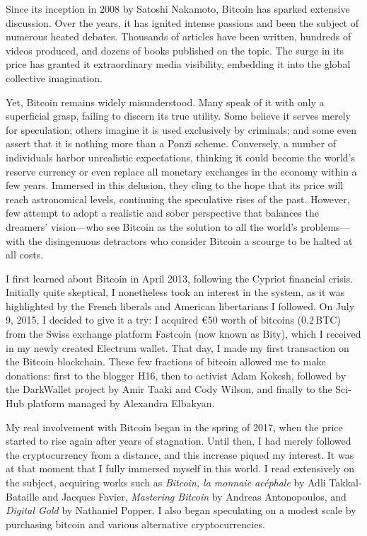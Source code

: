 \documentclass[
  a5paper,
  smalldemyvopaper,10pt,twoside,onecolumn,openright,extrafontsizes,hidelinks]{memoir}
\begin{document}

Since its inception in 2008 by Satoshi Nakamoto, Bitcoin has sparked
extensive discussion. Over the years, it has ignited intense passions
and been the subject of numerous heated debates. Thousands of articles
have been written, hundreds of videos produced, and dozens of books
published on the topic. The surge in its price has granted it
extraordinary media visibility, embedding it into the global collective
imagination.

Yet, Bitcoin remains widely misunderstood. Many speak of it with only a
superficial grasp, failing to discern its true utility. Some believe it
serves merely for speculation; others imagine it is used exclusively by
criminals; and some even assert that it is nothing more than a Ponzi
scheme. Conversely, a number of individuals harbor unrealistic
expectations, thinking it could become the world's reserve currency or
even replace all monetary exchanges in the economy within a few years.
Immersed in this delusion, they cling to the hope that its price will
reach astronomical levels, continuing the speculative rises of the past.
However, few attempt to adopt a realistic and sober perspective that
balances the dreamers' vision---who see Bitcoin as the solution to all
the world's problems---with the disingenuous detractors who consider
Bitcoin a scourge to be halted at all costs.

I first learned about Bitcoin in April 2013, following the Cypriot
financial crisis. Initially quite skeptical, I nonetheless took an
interest in the system, as it was highlighted by the French liberals and
American libertarians I followed. On July 9, 2015, I decided to give it
a try: I acquired €50 worth of bitcoins (0.2\,BTC) from the Swiss
exchange platform Fastcoin (now known as Bity), which I received in my
newly created Electrum wallet. That day, I made my first transaction on
the Bitcoin blockchain. These few fractions of bitcoin allowed me to
make donations: first to the blogger H16, then to activist Adam Kokesh,
followed by the DarkWallet project by Amir Taaki and Cody Wilson, and
finally to the Sci-Hub platform managed by Alexandra Elbakyan.

My real involvement with Bitcoin began in the spring of 2017, when the
price started to rise again after years of stagnation. Until then, I had
merely followed the cryptocurrency from a distance, and this increase
piqued my interest. It was at that moment that I fully immersed myself
in this world. I read extensively on the subject, acquiring works such
as \emph{Bitcoin, la monnaie acéphale} by Adli Takkal-Bataille and
Jacques Favier, \emph{Mastering Bitcoin} by Andreas Antonopoulos, and
\emph{Digital Gold} by Nathaniel Popper. I also began speculating on a
modest scale by purchasing bitcoin and various alternative
cryptocurrencies.
\end{document}

